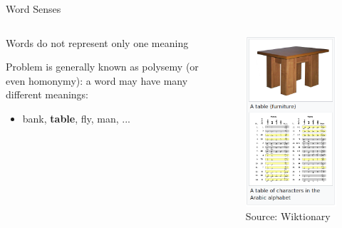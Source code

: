 \documentclass[12pt]{beamer}
\begin{document}
\begin{frame}{Word Senses}
	
\begin{columns}
	
	\begin{column}{6cm}
			Words do not represent only one meaning
			
			\bigskip
			
				Problem is generally known as polysemy (or even homonymy): a word may have many different meanings:

			\begin{itemize}
				\item bank, \textbf{table}, fly, man, ...
			\end{itemize}

	\end{column}

\begin{column}{4cm}

\begin{figure}
	\includegraphics[width=0.8\linewidth]{img/wiktionary-table.png}
	\caption{Source: Wiktionary}
\end{figure}


\end{column}
\end{columns}
\end{frame}
\end{document}
